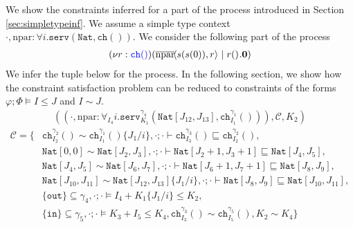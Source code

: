 \begin{exmp}\label{examp:consinferr}
We show the constraints inferred for a part of the process introduced in Section \ref{sec:simpletypeinf}. We assume a simple type context $\cdot,\text{npar} : \forall i.\texttt{serv}(\texttt{Nat},\texttt{ch}())$. We consider the following part of the process
%
\begin{align*}
    (\nu r : {\color{blue} \texttt{ch}()})( \overline{\text{npar}}\!\langle s(s(0)),r\rangle^{} \mid r()^{}.\mathbf{0} )
\end{align*}
%
We infer the tuple below for the process. In the following section, we show how the constraint satisfaction problem can be reduced to constraints of the forms $\varphi;\Phi\vDash I \leq J$ and $I \sim J$.
%
\begin{align*}
    ((\cdot,\text{npar} : \forall_{I_4}i.\texttt{serv}^{\gamma_4}_{K_1}(\texttt{Nat}[J_{12},J_{13}],\texttt{ch}^{\gamma_1}_{I_1}())),\mathcal{C},K_2) 
\end{align*}
\begin{align*}
    \mathcal{C} = \{&\texttt{ch}^{\gamma_2}_{I_2}()\sim\texttt{ch}^{\gamma_1}_{I_1}()\{J_1/i\}, \cdot;\cdot\vdash \texttt{ch}^{\gamma_3}_{I_3}() \sqsubseteq \texttt{ch}^{\gamma_2}_{I_2}(),\\
    &\texttt{Nat}[0,0] \sim \texttt{Nat}[J_2,J_3], \cdot;\cdot\vdash\texttt{Nat}[J_2 + 1,J_3 + 1] \sqsubseteq \texttt{Nat}[J_4,J_5],\\
    &\texttt{Nat}[J_4,J_5] \sim \texttt{Nat}[J_6,J_7], \cdot;\cdot\vdash \texttt{Nat}[J_6+1,J_7+1] \sqsubseteq \texttt{Nat}[J_8,J_9],\\
    &  \texttt{Nat}[J_{10},J_{11}] \sim \texttt{Nat}[J_{12},J_{13}]\{J_1/i\},\cdot;\cdot\vdash \texttt{Nat}[J_8,J_9] \sqsubseteq \texttt{Nat}[J_{10},J_{11}],\\
    & \{\texttt{out}\} \subseteq \gamma_4, \cdot;\cdot\vDash I_4 + K_1\{J_1/i\} \leq K_2,\\
    & \{\texttt{in}\} \subseteq \gamma_5,\cdot;\cdot\vDash K_3 + I_5 \leq K_4, \texttt{ch}^{\gamma_3}_{I_3}() \sim \texttt{ch}^{\gamma_5}_{I_5}(),K_2 \sim K_4\}
\end{align*}
\end{exmp}





